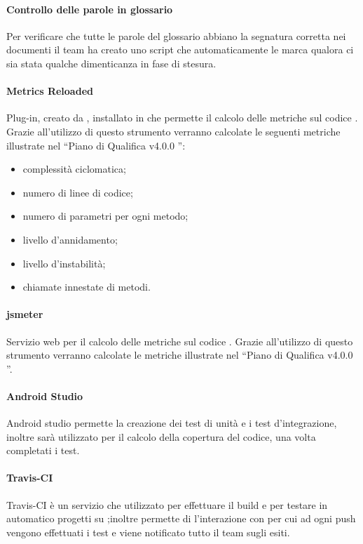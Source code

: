 \paragraph{Controllo delle parole in glossario}
Per verificare che tutte le parole del glossario abbiano la segnatura corretta nei documenti il team ha creato uno script che automaticamente le marca qualora ci sia stata qualche dimenticanza in fase di stesura.

\paragraph{Metrics Reloaded}
Plug-in, creato da , installato in  che permette il calcolo delle metriche sul codice . Grazie all'utilizzo di questo strumento verranno calcolate le seguenti metriche illustrate nel “Piano di Qualifica v4.0.0 ”:
\begin{itemize}
	\item complessità ciclomatica;
	\item numero di linee di codice;
	\item numero di parametri per ogni metodo;
	\item livello d'annidamento;
	\item livello d'instabilità;
	\item chiamate innestate di metodi.
\end{itemize}

\paragraph{jsmeter}
Servizio web per il calcolo delle metriche sul codice . Grazie all'utilizzo di questo strumento verranno calcolate le metriche illustrate nel “Piano di Qualifica v4.0.0 ”.

\paragraph{Android Studio}
Android studio permette la creazione dei test di unità e i test d'integrazione, inoltre sarà utilizzato per il calcolo della copertura del codice, una volta completati i test.

\paragraph{Travis-CI}{Travis-CI è un servizio che utilizzato per effettuare il build e per testare in automatico progetti su ;inoltre permette di l'interazione con  per cui ad ogni push vengono effettuati i test e viene notificato tutto il team sugli esiti.}
